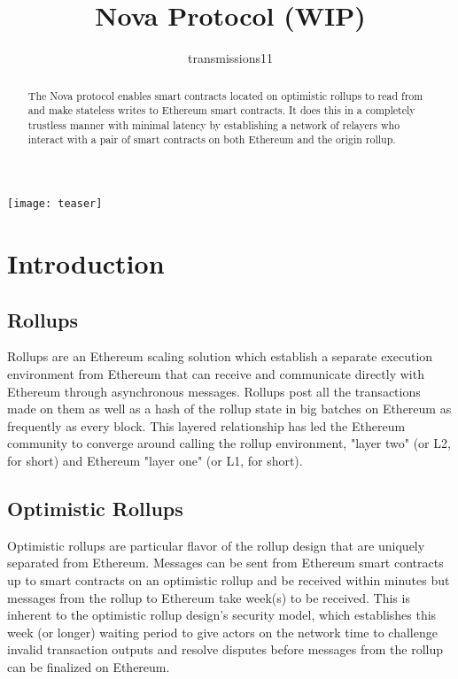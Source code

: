 \documentclass[sigplan,screen,nonacm]{acmart}
\begin{document}
\title{Nova Protocol (WIP)}
\author{transmissions11}

\begin{abstract}
The Nova protocol enables smart contracts located on optimistic rollups to read from and make stateless writes to Ethereum smart contracts. It does this in a completely trustless manner with minimal latency by establishing a network of relayers who interact with a pair of smart contracts on both Ethereum and the origin rollup.
\end{abstract}

\begin{teaserfigure}
  \texttt{[image: teaser]}
  \caption*{}
\end{teaserfigure}

\maketitle

\section{Introduction}

\subsection{Rollups}

Rollups are an Ethereum scaling solution which establish a separate execution environment from Ethereum that can receive and communicate directly with Ethereum through asynchronous messages. Rollups post all the transactions made on them as well as a hash of the rollup state in big batches on Ethereum as frequently as every block. This layered relationship has led the Ethereum community to converge around calling the rollup environment, "layer two" (or L2, for short) and Ethereum "layer one" (or L1, for short).

\subsection{Optimistic Rollups}

Optimistic rollups are particular flavor of the rollup design that are uniquely separated from Ethereum. Messages can be sent from Ethereum smart contracts up to smart contracts on an optimistic rollup and be received within minutes but messages from the rollup to Ethereum take week(s) to be received. This is inherent to the optimistic rollup design's security model, which establishes this week (or longer) waiting period to give actors on the network time to challenge invalid transaction outputs and resolve disputes before messages from the rollup can be finalized on Ethereum.
\end{document}
